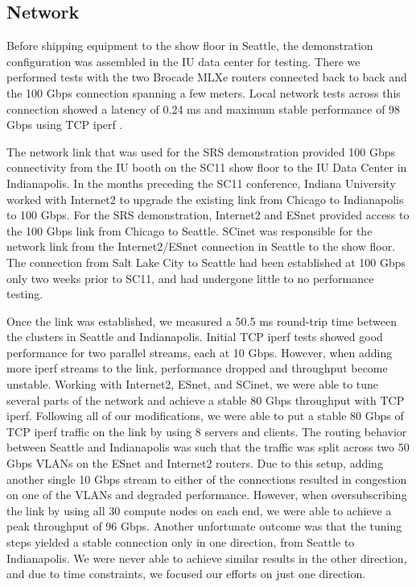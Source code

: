 \documentclass[]{sig-alternate}
\begin{document}
\subsection{Network}\label{sec:network}

Before shipping equipment to the show floor in Seattle, the demonstration configuration was assembled in the IU
data center for testing.  There we performed tests with the two Brocade MLXe routers connected back to back
and the 100 Gbps connection spanning a few meters.  Local network tests across this connection showed a
latency of 0.24 ms and maximum stable performance of 98 Gbps using TCP iperf \cite{iperf2012}.

The network link that was used for the SRS demonstration provided 100 Gbps connectivity from the IU booth on
the SC11 show floor to the IU Data Center in Indianapolis. In the months preceding the SC11 conference,
Indiana University worked with Internet2 to upgrade the existing link from Chicago to Indianapolis to 100
Gbps. For the SRS demonstration, Internet2 and ESnet provided access to the 100 Gbps link from Chicago to
Seattle. SCinet was responsible for the network link from the Internet2/ESnet connection in Seattle to the
show floor. The connection from Salt Lake City to Seattle had been established at 100 Gbps only two weeks
prior to SC11, and had undergone little to no performance testing.

Once the link was established, we measured a 50.5 ms round-trip time between the clusters in Seattle and
Indianapolis. Initial TCP iperf tests showed good performance for two parallel streams, each at 10
Gbps. However, when adding more iperf streams to the link, performance dropped and throughput become
unstable. Working with Internet2, ESnet, and SCinet, we were able to tune several parts of the network and
achieve a stable 80 Gbps throughput with TCP iperf. Following all of our modifications, we were able to put a
stable 80 Gbps of TCP iperf traffic on the link by using 8 servers and clients. The routing behavior between
Seattle and Indianapolis was such that the traffic was split across two 50 Gbps VLANs on the ESnet and
Internet2 routers. Due to this setup, adding another single 10 Gbps stream to either of the connections
resulted in congestion on one of the VLANs and degraded performance. However, when oversubscribing the link by
using all 30 compute nodes on each end, we were able to achieve a peak throughput of 96 Gbps. Another
unfortunate outcome was that the tuning steps yielded a stable connection only in one direction, from Seattle
to Indianapolis. We were never able to achieve similar results in the other direction, and due to time
constraints, we focused our efforts on just one direction.
\end{document}
